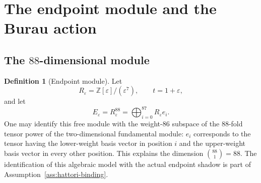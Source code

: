 \documentclass[10pt,reqno]{amsart}
\theoremstyle{definition}
\newtheorem{definition}[theorem]{Definition}
\theoremstyle{remark}
\newcommand{\Z}{\mathbb Z}
\newcommand{\eps}{\varepsilon}
\begin{document}
\section{The endpoint module and the Burau action}\label{sec:endpoint}

\subsection{The \texorpdfstring{$88$}{88}-dimensional module}

\begin{definition}[Endpoint module]\label{def:endpoint-module}
Let
\begin{equation}\label{eq:R-eps}
R_\eps=\Z[\eps]/(\eps^7),\qquad t=1+\eps,
\end{equation}
and let
\begin{equation}\label{eq:E88}
E_\eps=R_\eps^{88}=\bigoplus_{i=0}^{87}R_\eps e_i.
\end{equation}
One may identify this free module with the weight-$86$ subspace of the
$88$-fold tensor power of the two-dimensional fundamental module: $e_i$
corresponds to the tensor having the lower-weight basis vector in position
$i$ and the upper-weight basis vector in every other position.  This explains
the dimension $\binom{88}{1}=88$.  The identification of this algebraic model
with the actual endpoint shadow is part of
Assumption~\ref{ass:hattori-binding}.
\end{definition}
\end{document}
